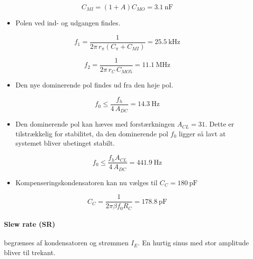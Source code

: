 \documentclass[danish]{article}
\begin{document}
\begin{equation} 
C_{MI} = (1+A)C_{MO} = \SI{3.1}{\nano\farad}
\end{equation}

\begin{itemize}
	\item Polen ved ind- og udgangen findes.
\end{itemize}

\begin{equation} 
f_1 = \dfrac{1}{2\pi \, r_{\pi} (C_{\pi} + C_{MI})} = \SI{25.5}{\kilo\hertz}
\end{equation}

\begin{equation} 
f_2 = \dfrac{1}{2\pi \, r_C \, C_{MO5}} = \SI{11.1}{\mega\hertz}
\end{equation}

\begin{itemize}
	\item Den nye dominerende pol findes ud fra den høje pol.
\end{itemize}

\begin{equation} 
f_0  \leq \frac{f_h}{4\,A_{DC}} = \SI{14.3}{\hertz}
\end{equation}

\begin{itemize}
	\item Den dominerende pol kan hæves med forstærkningen $A_{CL} = 31$. Dette er tilstrækkelig for stabilitet, da den dominerende pol $f_0$ ligger så lavt at systemet bliver ubetinget stabilt.
\end{itemize}

\begin{equation}
f_0  \leq \frac{f_h A_{CL}}{4\,A_{DC}} = \SI{441.9}{\hertz}
\end{equation}

\begin{itemize}
	\item Kompenseringskondensatoren kan nu vælges til $C_C = \SI{180}{\pico\farad}$
\end{itemize}

\begin{equation} 
C_C  = \frac{1}{2\pi \beta f_0 R_C} = \SI{178.8}{\pico\farad}
\end{equation}

\paragraph{Slew rate (SR)} begrænses af kondensatoren og strømmen $I_E$. En hurtig sinus med stor amplitude bliver til trekant.\\
\end{document}

